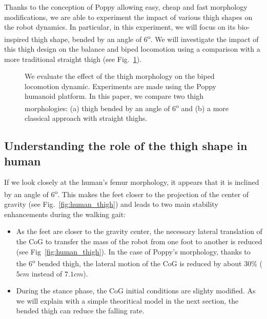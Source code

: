 Thanks to the conception of Poppy allowing easy, cheap and fast morphology modifications, we are able to experiment the impact of various thigh shapes on the robot dynamics. In particular, in this experiment, we will focus on its bio-inspired thigh shape, bended by an angle of 6\textsuperscript{o}. We will investigate the impact of this thigh design on the balance and biped locomotion using a comparison with a more traditional straight thigh (see Fig.~\ref{fig:poppy_compared}).



\begin{figure}[!t]
\centering
    \hfil
    \caption{We evaluate the effect of the thigh morphology on the biped locomotion dynamic.
    Experiments are made using the Poppy humanoid platform.
    In this paper, we compare two thigh morphologies: (a) thigh bended by an angle of 6\textsuperscript{o} and (b) a more classical approach with straight thighs.}
    \label{fig:poppy_compared}
\end{figure}


\subsection{Understanding the role of the thigh shape in human} %

If we look closely at the human's femur morphology, it appears that it is inclined by an angle of 6\textsuperscript{o}. This makes the feet closer to the projection of the center of gravity (see Fig.~\ref{fig:human_thigh}) and leads to two main stability enhancements during the walking gait:

\begin{itemize}
    \item As the feet are closer to the gravity center, the necessary lateral translation of the CoG to transfer the mass of the robot from one foot to another is reduced (see Fig~\ref{fig:human_thigh}). In the case of Poppy's morphology, thanks to the $6$\textsuperscript{o} bended thigh, the lateral motion of the CoG is reduced by about 30\% ($ 5 cm$ instead of $7.1 cm$).
    \item During the stance phase, the CoG initial conditions are slighty modified. As we will explain with a simple theoritical model in the next section, the bended thigh can reduce the falling rate.
\end{itemize}


